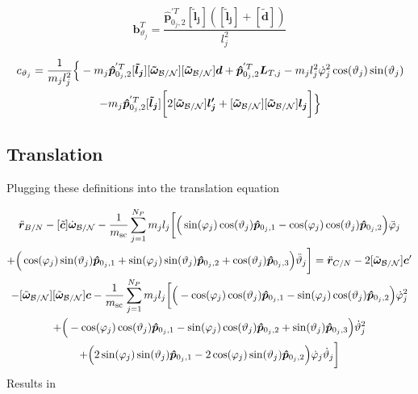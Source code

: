 \documentclass[]{BasiliskReportMemo}
\begin{document}
	\begin{equation}
	\bm b_{\vartheta_j}^{T} = \frac{\bm{\hat{p}}_{0_j,2}^{'T} [\bm{\tilde{l}_j}]( [\bm{\tilde{l}_j}] + [\bm{\tilde{d}}])}{ l_j^2}
	\label{eq:BSM11}
	\end{equation}
	
	\begin{multline}
    c_{\vartheta_j} = \frac{1}{m_j l_j^2}\Big\{-m_{j} \bm{\hat{p}}_{0_j,2}^{'T}[\bm{\tilde{l}_j}][\bm{\tilde{\omega}}_{\cal B/N}][\bm{\tilde{\omega}}_{\cal B/N}] \bm{d}+\bm{\hat{p}}_{0_j,2}^{'T} \bm{L}_{T,j}-m_j l_j^2\dot{\varphi}_j^2\cos(\vartheta_j)\sin(\vartheta_j)\\- m_j \bm{\hat{p}}_{0_j,2}^{'T} [\bm{\tilde{l}_j}]\bigg[2[\bm{\tilde{\omega}}_{\cal B/N}] \bm{l_j'}+[\bm{\tilde{\omega}}_{\cal B/N}][\bm{\tilde{\omega}}_{\cal B/N}] \bm{l_j}\bigg] \Big\}
	\label{eq:BSM12}
	\end{multline}

	\subsection{Translation}

Plugging these definitions into the translation equation
	
\begin{multline}
	\ddot{\bm r}_{B/N}-[\tilde{\bm{c}}] \dot{\bm\omega}_{\cal B/N}-\frac{1}{m_{\text{sc}}}\sum_{j=1}^{N_{P}}m_j l_j \bigg[
	\Big(\sin(\varphi_j)\cos(\vartheta_j)\bm{\hat{p}}_{0_j,1}-\cos(\varphi_j)\cos(\vartheta_j)\bm{\hat{p}}_{0_j,2}\Big)\ddot{\varphi}_j \\+\Big(\cos(\varphi_j)\sin(\vartheta_j)\bm{\hat{p}}_{0_j,1}+\sin(\varphi_j)\sin(\vartheta_j)\bm{\hat{p}}_{0_j,2}+\cos(\vartheta_j)\bm{\hat{p}}_{0_j,3}\Big)\ddot{\vartheta}_j
	\bigg]= \ddot{\bm r}_{C/N} 	- 2[\tilde{\bm\omega}_{\cal B/N}] \bm c'
	\\-[\tilde{\bm\omega}_{\cal B/N}][\tilde{\bm\omega}_{\cal B/N}]\bm{c}
	-\frac{1}{m_{\text{sc}}}\sum_{j=1}^{N_{P}}m_j l_j \bigg[
	\Big(-\cos(\varphi_j)\cos(\vartheta_j)\bm{\hat{p}}_{0_j,1}-\sin(\varphi_j)\cos(\vartheta_j)\bm{\hat{p}}_{0_j,2}\Big)\dot{\varphi}_j^2
	\\+\Big(-\cos(\varphi_j)\cos(\vartheta_j)\bm{\hat{p}}_{0_j,1}-\sin(\varphi_j)\cos(\vartheta_j)\bm{\hat{p}}_{0_j,2}+\sin(\vartheta_j)\bm{\hat{p}}_{0_j,3} \Big)\dot{\vartheta}_j^2 \\+
	\Big(2\sin(\varphi_j)\sin(\vartheta_j)\bm{\hat{p}}_{0_j,1} -2\cos(\varphi_j)\sin(\vartheta_j)\bm{\hat{p}}_{0_j,2}\Big)\dot{\varphi}_j\dot{\vartheta}_j
	\bigg]
	\label{eq:Rbddot4_bis}
\end{multline}
Results in
\end{document}
